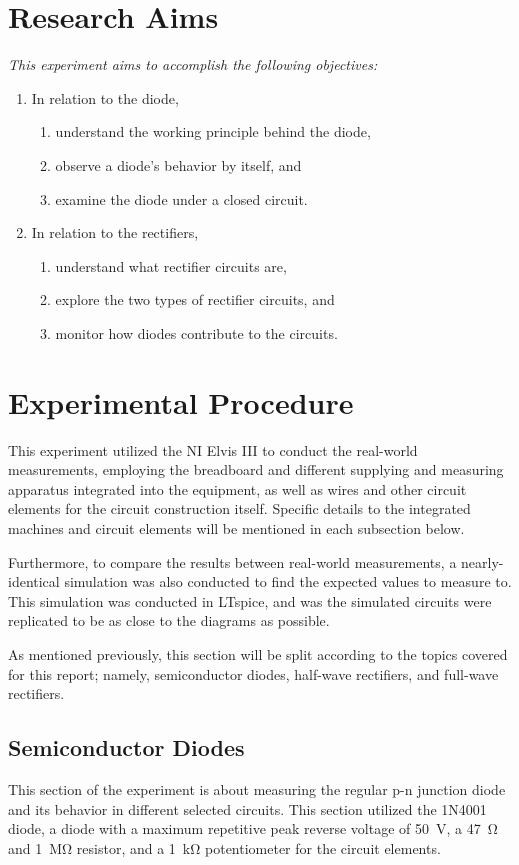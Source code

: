 \documentclass[11pt]{report}
\begin{document}
\section{Research Aims}
\textit{This experiment aims to accomplish the following objectives:}
\begin{enumerate}
	\itemsep 0em
	\item In relation to the diode,
	\begin{enumerate}
		\item understand the working principle behind the diode,
		\item observe a diode's behavior by itself, and
		\item examine the diode under a closed circuit.
	\end{enumerate}
	\item In relation to the rectifiers,
	\begin{enumerate}
		\item understand what rectifier circuits are,
		\item explore the two types of rectifier circuits, and
		\item monitor how diodes contribute to the circuits.
	\end{enumerate}
\end{enumerate}

\section{Experimental Procedure}
This experiment utilized the NI Elvis III to conduct the real-world measurements, employing the breadboard and different supplying and measuring apparatus integrated into the equipment, as well as wires and other circuit elements for the circuit construction itself. Specific details to the integrated machines and circuit elements will be mentioned in each subsection below.

Furthermore, to compare the results between real-world measurements, a nearly-identical simulation was also conducted to find the expected values to measure to. This simulation was conducted in LTspice, and was the simulated circuits were replicated to be as close to the diagrams as possible.

As mentioned previously, this section will be split according to the topics covered for this report; namely, semiconductor diodes, half-wave rectifiers, and full-wave rectifiers.

\subsection{Semiconductor Diodes}
This section of the experiment is about measuring the regular p-n junction diode and its behavior in different selected circuits. This section utilized the 1N4001 diode, a diode with a maximum repetitive peak reverse voltage of \SI{50}{\volt}, a \SI{47}{\ohm} and \SI{1}{\mega\ohm} resistor, and a \SI{1}{\kilo\ohm} potentiometer for the circuit elements.
\end{document}
